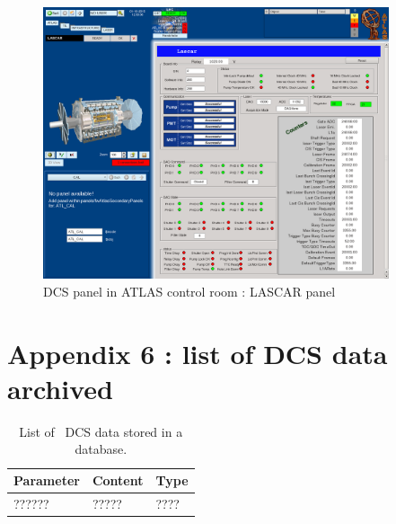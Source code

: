 \begin{figure}[htbp]
\centering
\includegraphics[height=8cm]{figures/dcs_cr_lascar.png}
\caption{DCS panel in ATLAS control room : LASCAR panel}\label{fig:dcs_cr_e}
\end{figure}

\newpage

\part*{Appendix 6 : list of DCS data archived}
\label{app:e}

\begin{table}[htbp]
  \begin{center}
    \begin{tabular}{lll}
      \hline\hline
      Parameter & Content & Type \\
      \hline
    ?????? & ????? & ???? \\
      \hline
    \end{tabular}
   \caption{List of \lasii~DCS data stored in a database.}\label{tab:dcsarchive}
  \end{center}
\end{table}
